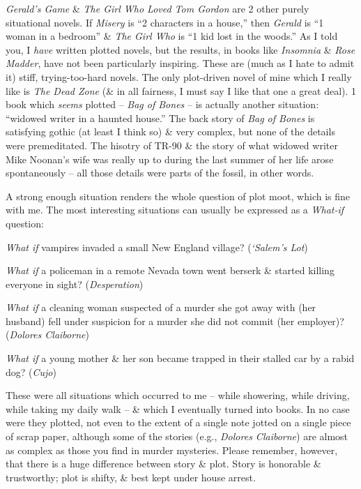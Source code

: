 \documentclass{article}
\numberwithin{equation}{section}
\begin{document}
\textit{Gerald's Game} \& \textit{The Girl Who Loved Tom Gordon} are 2 other purely situational novels. If \textit{Misery} is ``2 characters in a house,'' then \textit{Gerald} is ``1 woman in a bedroom'' \& \textit{The Girl Who} is ``1 kid lost in the woods.'' As I told you, I \textit{have} written plotted novels, but the results, in books like \textit{Insomnia} \& \textit{Rose Madder}, have not been particularly inspiring. These are (much as I hate to admit it) stiff, trying-too-hard novels. The only plot-driven novel of mine which I really like is \textit{The Dead Zone} (\& in all fairness, I must say I like that one a great deal). 1 book which \textit{seems} plotted -- \textit{Bag of Bones} -- is actually another situation: ``widowed writer in a haunted house.'' The back story of \textit{Bag of Bones} is satisfying gothic (at least I think so) \& very complex, but none of the details were premeditated. The hisotry of TR-90 \& the story of what widowed writer Mike Noonan's wife was really up to during the last summer of her life arose spontaneously -- all those details were parts of the fossil, in other words.

A strong enough situation renders the whole question of plot moot, which is fine with me. The most interesting situations can usually be expressed as a \textit{What-if} question:

\textit{What if} vampires invaded a small New England village? (\textit{`Salem's Lot})

\textit{What if} a policeman in a remote Nevada town went berserk \& started killing everyone in sight? (\textit{Desperation})

\textit{What if} a cleaning woman suspected of a murder she got away with (her husband) fell under suspicion for a murder she did not commit (her employer)? (\textit{Dolores Claiborne})

\textit{What if} a young mother \& her son became trapped in their stalled car by a rabid dog? (\textit{Cujo})

These were all situations which occurred to me -- while showering, while driving, while taking my daily walk -- \& which I eventually turned into books. In no case were they plotted, not even to the extent of a single note jotted on a single piece of scrap paper, although some of the stories (e.g., \textit{Dolores Claiborne}) are almost as complex as those you find in murder mysteries. Please remember, however, that there is a huge difference between story \& plot. Story is honorable \& trustworthy; plot is shifty, \& best kept under house arrest.
\end{document}
